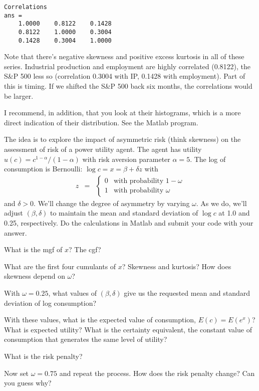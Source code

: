 \documentclass[11pt]{exam}
\begin{document}
\begin{questions}
\begin{solution}
\begin{verbatim}
Correlations
ans =
    1.0000    0.8122    0.1428
    0.8122    1.0000    0.3004
    0.1428    0.3004    1.0000
\end{verbatim}
%
Note that there's negative skewness and positive excess kurtosis
in all of these series.
Industrial production and employment are highly correlated (0.8122), 
the S\&P 500 less so
(correlation 0.3004 with IP, 0.1428 with employment).
Part of this is timing.  If we shifted the S\&P 500 back six months,
the correlations would be larger.

I recommend, in addition, that you look at their
histograms, which is a more direct indication of their distribution.
See the Matlab program.
\end{solution}


The idea is to explore the impact of asymmetric risk (think skewness)
on the assessment of risk of a power utility agent.
The agent has utility $u(c) = c^{1-\alpha}/(1-\alpha)$ with
risk aversion parameter $\alpha = 5$.
The log of consumption is Bernoulli:
$\log c = x =  \beta + \delta z $ with
\begin{eqnarray*}
    z &=& \left\{
            \begin{array}{ll}
            0   & \mbox{with probability } 1-\omega \\
            1 & \mbox{with probability } \omega
            \end{array}
            \right.
\end{eqnarray*}
and $\delta > 0$.
We'll change the degree of asymmetry by varying $\omega$.
As we do, we'll adjust $(\beta,\delta)$ to maintain the
mean and standard deviation of $\log c$ at 1.0 and 0.25, respectively.
Do the calculations in Matlab and submit your code with your answer.
%
\begin{parts}
\item What is the mgf of $x$?  The cgf?
\item What are the first four cumulants of $x$?
Skewness and kurtosis?
How does skewness depend on $\omega$?
\item With $\omega = 0.25$, what values of
$(\beta,\delta)$ give us the requested mean and standard deviation of log consumption?
\item With these values,
what is the expected value of consumption, $E(c) = E(e^x)$?
What is expected utility?
What is the certainty equivalent, the constant value of consumption
that generates the same level of utility?
\item What is the risk penalty?
\item Now set $\omega = 0.75$ and repeat the process.
How does the risk penalty change?
Can you guess why?
\end{parts}


\end{questions}
\end{document}
